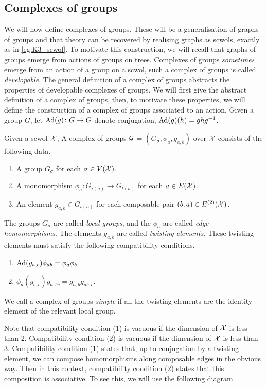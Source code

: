 \subsection{Complexes of groups}
We will now define complexes of groups.
These will be a generalisation of graphs of groups and that theory can be recovered by realising graphs as scwols, exactly as in \cref{eg:K3_scwol}.
To motivate this construction, we will recall that graphs of groups emerge from actions of groups on trees.
Complexes of groups \emph{sometimes} emerge from an action of a group on a scwol, such a complex of groups is called \emph{developable}.
The general definition of a complex of groups abstracts the properties of developable complexes of groups.
We will first give the abstract definition of a complex of groups, then, to motivate these properties, we will define the construction of a complex of groups associated to an action.
Given a group $G$, let $\operatorname{Ad}(g) \colon G \to G$ denote conjugation, $\operatorname{Ad}(g)(h) = ghg^{-1}$.

\begin{definition}
	Given a scwol $\mathcal{X}$, A complex of groups $\mathcal{G}$ = $(G_\sigma, \phi_a, g_{a,b})$ over $\mathcal{X}$ consists of the following data.
	\begin{enumerate}
		\item A group $G_\sigma$ for each $\sigma \in V(\mathcal{X})$.
		\item A monomorphism $\phi_a \colon G_{i(a)} \to G_{t(a)}$ for each $a \in E(\mathcal{X})$.
		\item An element $g_{a,b} \in G_{t(a)}$ for each composable pair $(b,a) \in E^{(2)}(\mathcal{X})$.
	\end{enumerate}
	The groups $G_\sigma$ are called \emph{local groups}, and the $\phi_a$ are called \emph{edge homomorphisms}.
	The elements $g_{a,b}$ are called \emph{twisting elements}.
	These twisting elements must satisfy the following compatibility conditions.
	\begin{enumerate}
		\item $\operatorname{Ad}(g_{a,b}) \phi_{ab} = \phi_a \phi_b$.
		\item $\phi_a(g_{b,c})g_{a,bc} = g_{a,b}g_{ab,c}$.
	\end{enumerate}
	We call a complex of groups \emph{simple} if all the twisting elements are the identity element of the relevant local group.
	\label{def:complex_of_groups}
\end{definition}

Note that compatibility condition (1) is vacuous if the dimension of $\mathcal{X}$ is less than 2.
Compatibility condition (2) is vacuous if the dimension of  $\mathcal{X}$ is less than 3.
Compatibility condition (1) states that, up to conjugation by a twisting element, we can compose homomorphisms along composable edges in the obvious way.
Then in this context, compatibility condition (2) states that this composition is associative.
To see this, we will use the following diagram.

